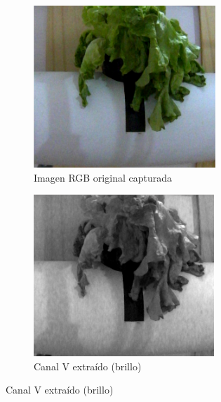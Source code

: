 \begin{figure}[H]
\centering
\begin{subfigure}[b]{0.48\textwidth}
    \centering
    \includegraphics[width=\textwidth]{imagenes/detector_marcadores_1_original.png}
    \caption{Imagen RGB original capturada}
\end{subfigure}
\hfill
\begin{subfigure}[b]{0.48\textwidth}
    \centering
    \includegraphics[width=\textwidth]{imagenes/detector_marcadores_2_canal_v.png}
    \caption{Canal V extraído (brillo)}
\end{subfigure}


\end{figure}
